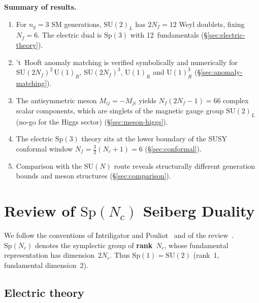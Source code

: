 \documentclass[11pt,a4paper]{article}
\theoremstyle{plain}
\theoremstyle{definition}
\theoremstyle{remark}
\newcommand{\Nc}{N_{\!c}}
\newcommand{\Nf}{N_{\!f}}
\newcommand{\SU}[1]{\mathrm{SU}(#1)}
\newcommand{\UU}[1]{\mathrm{U}(#1)}
\newcommand{\Sp}[1]{\mathrm{Sp}(#1)}
\begin{document}
\medskip

\textbf{Summary of results.}
\begin{enumerate}
  \item For $n_g = 3$ SM generations, $\SU{2}_L$ has $2\Nf = 12$
    Weyl doublets, fixing $\Nf = 6$.  The electric dual is
    $\Sp{3}$ with 12~fundamentals (\S\ref{sec:electric-theory}).
  \item 't~Hooft anomaly matching is verified symbolically and
    numerically for $\SU{2\Nf}^2\,\UU{1}_R$, $\SU{2\Nf}^3$, $\UU{1}_R$
    and $\UU{1}_R^3$ (\S\ref{sec:anomaly-matching}).
  \item The antisymmetric meson $M_{ij} = -M_{ji}$ yields
    $\Nf(2\Nf - 1) = 66$ complex scalar components, which are singlets
    of the magnetic gauge group $\SU{2}_L$ (no-go for the Higgs sector)
    (\S\ref{sec:meson-higgs}).
  \item The electric $\Sp{3}$ theory sits at the lower boundary of
    the SUSY conformal window
    $\Nf = \tfrac{3}{2}(\Nc + 1) = 6$ (\S\ref{sec:conformal}).
  \item Comparison with the $\SU{N}$ route reveals structurally
    different generation bounds and meson structures
    (\S\ref{sec:comparison}).
\end{enumerate}


\section{Review of $\Sp{\Nc}$ Seiberg Duality}
\label{sec:review}

We follow the conventions of Intriligator and
Pouliot~\cite{IP9505006} and of the review~\cite{IS1995}.  $\Sp{\Nc}$
denotes the symplectic
group of \textbf{rank}~$\Nc$, whose fundamental representation has
dimension~$2\Nc$.  Thus $\Sp{1} = \SU{2}$ (rank~1, fundamental
dimension~2).

\subsection{Electric theory}
\end{document}
